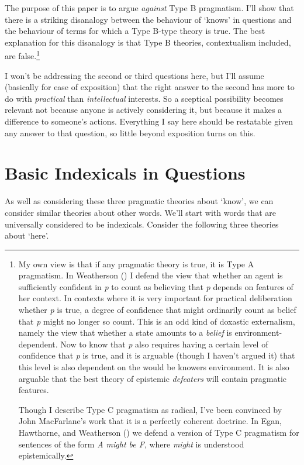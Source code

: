 \documentclass[
  11pt,
  letterpaper,
  DIV=11,
  numbers=noendperiod,
  twoside]{scrartcl}
\begin{document}
The purpose of this paper is to argue \emph{against} Type B pragmatism.
I'll show that there is a striking disanalogy between the behaviour of
`knows' in questions and the behaviour of terms for which a Type B-type
theory is true. The best explanation for this disanalogy is that Type B
theories, contextualism included, are false.\footnote{My own view is
  that if any pragmatic theory is true, it is Type A pragmatism. In
  Weatherson () I defend the
  view that whether an agent is sufficiently confident in \emph{p} to
  count as believing that \emph{p} depends on features of her context.
  In contexts where it is very important for practical deliberation
  whether \emph{p} is true, a degree of confidence that might ordinarily
  count as belief that \emph{p} might no longer so count. This is an odd
  kind of doxastic externalism, namely the view that whether a state
  amounts to a \emph{belief} is environment-dependent. Now to know that
  \emph{p} also requires having a certain level of confidence that
  \emph{p} is true, and it is arguable (though I haven't argued it) that
  this level is also dependent on the would be knowers environment. It
  is also arguable that the best theory of epistemic \emph{defeaters}
  will contain pragmatic features.

  Though I describe Type C pragmatism as radical, I've been convinced by
  John MacFarlane's work that it is a perfectly coherent doctrine. In
  Egan, Hawthorne, and Weatherson ()
  we defend a version of Type C pragmatism for sentences of the form
  \emph{A might be F}, where \emph{might} is understood epistemically.}

I won't be addressing the second or third questions here, but I'll
assume (basically for ease of exposition) that the right answer to the
second has more to do with \emph{practical} than \emph{intellectual}
interests. So a sceptical possibility becomes relevant not because
anyone is actively considering it, but because it makes a difference to
someone's actions. Everything I say here should be restatable given any
answer to that question, so little beyond exposition turns on this.

\section{Basic Indexicals in
Questions}\label{basic-indexicals-in-questions}

As well as considering these three pragmatic theories about `know', we
can consider similar theories about other words. We'll start with words
that are universally considered to be indexicals. Consider the following
three theories about `here'.
\end{document}
